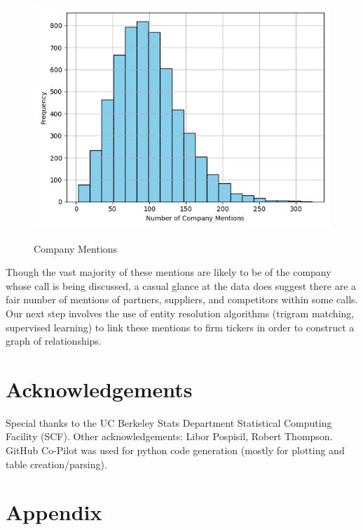 \documentclass{article}[11pt]
\begin{document}
    \begin{figure}[h!]
		\centering
        \caption{Company Mentions}
        \includegraphics[width=0.6\linewidth,keepaspectratio=true]{../Output/All Data EDA/NLP EDA - NER on Company Names/Company Mentions Distribution No Title.png}
        \label{fig:company-mentions}
	\end{figure}

    Though the vast majority of these mentions are likely to be of the company whose call is being discussed, a casual glance at the data does suggest there are a fair number of mentions of partners, suppliers, and competitors within some calls. Our next step involves the use of entity resolution algorithms (trigram matching, supervised learning) to link these mentions to firm tickers in order to construct a graph of relationships.
    
    \section*{Acknowledgements}

    Special thanks to the UC Berkeley Stats Department Statistical Computing Facility (SCF). Other acknowledgements: Libor Pospisil, Robert Thompson. GitHub Co-Pilot was used for python code generation (mostly for plotting and table creation/parsing).

    \clearpage
    \newpage

    
    

    \clearpage
    \newpage

    \appendix


    \section{Appendix}
\end{document}
